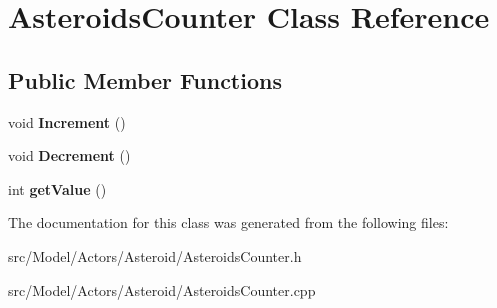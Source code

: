 \hypertarget{classAsteroidsCounter}{}\section{Asteroids\+Counter Class Reference}
\label{classAsteroidsCounter}
\subsection*{Public Member Functions}
\begin{DoxyCompactItemize}
\item 
void {\bfseries Increment} ()\hypertarget{classAsteroidsCounter_a5bfafaf855f6ddec948db0839a559933}{}\label{classAsteroidsCounter_a5bfafaf855f6ddec948db0839a559933}

\item 
void {\bfseries Decrement} ()\hypertarget{classAsteroidsCounter_a613c1e39f92e674e3e854378375fe77f}{}\label{classAsteroidsCounter_a613c1e39f92e674e3e854378375fe77f}

\item 
int {\bfseries get\+Value} ()\hypertarget{classAsteroidsCounter_a0ae133ae9c11f0dfef444df8f926cdaa}{}\label{classAsteroidsCounter_a0ae133ae9c11f0dfef444df8f926cdaa}

\end{DoxyCompactItemize}


The documentation for this class was generated from the following files\+:\begin{DoxyCompactItemize}
\item 
src/\+Model/\+Actors/\+Asteroid/Asteroids\+Counter.\+h\item 
src/\+Model/\+Actors/\+Asteroid/Asteroids\+Counter.\+cpp\end{DoxyCompactItemize}
